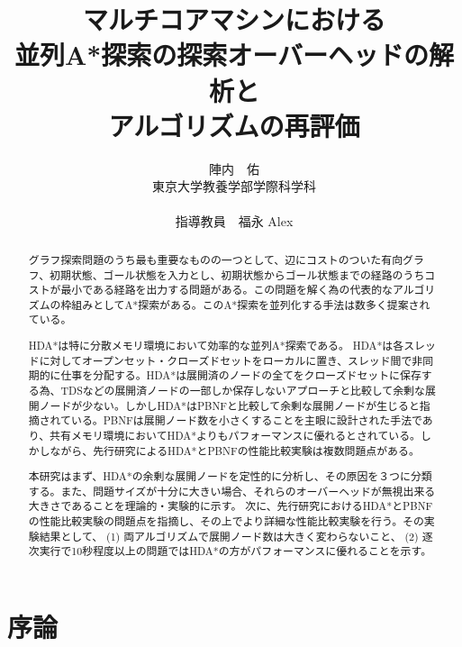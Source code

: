 \documentclass[uplatex]{jsarticle}
\title{マルチコアマシンにおける\\
並列A*探索の探索オーバーヘッドの解析と\\ %
アルゴリズムの再評価}
\author{陣内　佑 \\
東京大学教養学部学際科学科\\
\\
指導教員　福永 Alex}
\begin{document}
\maketitle
\thispagestyle{empty}

\begin{abstract}
グラフ探索問題のうち最も重要なものの一つとして、辺にコストのついた有向グラフ、初期状態、ゴール状態を入力とし、初期状態からゴール状態までの経路のうちコストが最小である経路を出力する問題がある。この問題を解く為の代表的なアルゴリズムの枠組みとしてA*探索がある。このA*探索を並列化する手法は数多く提案されている。

HDA*は特に分散メモリ環境において効率的な並列A*探索である。
HDA*は各スレッドに対してオープンセット・クローズドセットをローカルに置き、スレッド間で非同期的に仕事を分配する。HDA*は展開済のノードの全てをクローズドセットに保存する為、TDSなどの展開済ノードの一部しか保存しないアプローチと比較して余剰な展開ノードが少ない。しかしHDA*はPBNFと比較して余剰な展開ノードが生じると指摘されている。PBNFは展開ノード数を小さくすることを主眼に設計された手法であり、共有メモリ環境においてHDA*よりもパフォーマンスに優れるとされている。しかしながら、先行研究によるHDA*とPBNFの性能比較実験は複数問題点がある。

本研究はまず、HDA*の余剰な展開ノードを定性的に分析し、その原因を３つに分類する。また、問題サイズが十分に大きい場合、それらのオーバーヘッドが無視出来る大きさであることを理論的・実験的に示す。
次に、先行研究におけるHDA*とPBNFの性能比較実験の問題点を指摘し、その上でより詳細な性能比較実験を行う。その実験結果として、 (1) 両アルゴリズムで展開ノード数は大きく変わらないこと、 (2) 逐次実行で10秒程度以上の問題ではHDA*の方がパフォーマンスに優れることを示す。
\end{abstract}

\newpage
\tableofcontents
\thispagestyle{empty}
\newpage

\section{序論}
\setcounter{page}{1}
\end{document}
